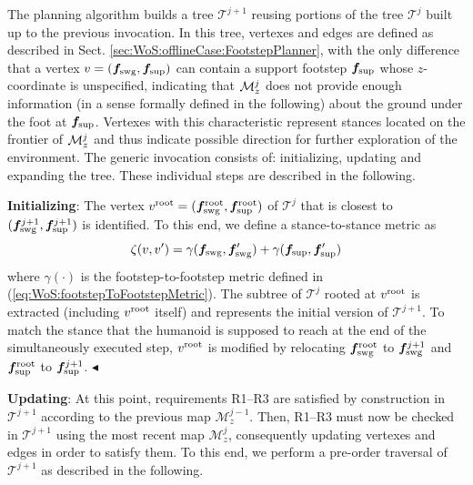 The planning algorithm builds a tree $\mathcal{T}^{j+1}$ reusing portions of the tree $\mathcal{T}^{j}$ built up to the previous invocation. 
In this tree, vertexes and edges are defined as described in Sect. \ref{sec:WoS:offlineCase:FootstepPlanner}, with the only difference that a vertex $v = ({\bm{f}}_{\rm swg}, {\bm{f}}_{\rm sup})$ can contain a support footstep ${\bm{f}}_{\rm sup}$ whose $z$-coordinate is unspecified, indicating that ${\cal M}_z^j$ does not provide enough information (in a sense formally defined in the following) about the ground under the foot at ${\bm{f}}_{\rm sup}$. 
Vertexes with this characteristic represent stances located on the frontier of ${\cal M}_z^j$ and thus indicate possible direction for further exploration of the environment. 
%
The generic invocation consists of: initializing, updating and expanding the tree. These individual steps are described in the following.

{\bf Initializing}: The vertex $v^{\rm root} = ({\bm{f}}_{\rm swg}^{\rm root}, {\bm{f}}_{\rm sup}^{\rm root})$ of $\mathcal{T}^{j}$ that is closest to $({\bm{f}}_{\rm swg}^{j+1}, {\bm{f}}_{\rm sup}^{j+1})$ is identified. To this end, we define a stance-to-stance metric as
\begin{equation}
    \label{eq:WoS:metricIdentifyRoot}
    \zeta(v, v') = \gamma({\bm{f}}_{\rm swg}, {\bm{f}}'_{\rm swg}) + \gamma({\bm{f}}_{\rm sup}, {\bm{f}}'_{\rm sup}) 
\end{equation}
where $\gamma(\cdot)$ is the footstep-to-footstep metric defined in (\ref{eq:WoS:footstepToFootstepMetric}).
The subtree of $\mathcal{T}^{j}$ rooted at $v^{\rm root}$ is extracted (including $v^{\rm root}$ itself) and represents the initial version of $\mathcal{T}^{j+1}$.
To match the stance that the humanoid is supposed to reach at the end of the simultaneously executed step, $v^{\rm root}$ is modified by relocating ${\bm{f}}_{\rm swg}^{\rm root}$ to ${\bm{f}}_{\rm swg}^{j+1}$ and ${\bm{f}}_{\rm sup}^{\rm root}$ to ${\bm{f}}_{\rm sup}^{j+1}$. \hfill $\blacktriangleleft$

{\bf Updating}: At this point, requirements R1--R3 are satisfied by construction in $\mathcal{T}^{j+1}$ according to the previous map $\mathcal{M}_z^{j-1}$.
Then, R1--R3 must now be checked in $\mathcal{T}^{j+1}$ using the most recent map $\mathcal{M}_z^{j}$, consequently updating vertexes and edges in order to satisfy them.
To this end, we perform a pre-order traversal of $\mathcal{T}^{j+1}$ as described in the following.

